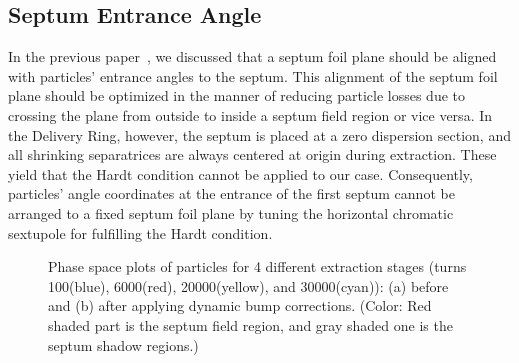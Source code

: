 \documentclass[aps,prstab,onecolumn,preprint]{revtex4-1}
\begin{document}
\subsection{\label{sec:bump0}Septum Entrance Angle}

In the previous paper~\cite{mu2e}, we discussed that a septum foil plane should be aligned with particles' entrance angles to the septum. This alignment of the septum foil plane should be optimized in the manner of reducing particle losses due to crossing the plane from outside to inside a septum field region or vice versa. In the Delivery Ring, however, the septum is placed at a zero dispersion section, and all shrinking separatrices are always centered at origin during extraction. These yield that the Hardt condition cannot be applied to our case. Consequently, particles' angle coordinates at the entrance of the first septum cannot be arranged to a fixed septum foil plane by tuning the horizontal chromatic sextupole for fulfilling the Hardt condition.

\begin{figure}[!hbtp]
  \caption{\label{fig:bump1}Phase space plots of particles for 4 different extraction stages (turns 100(blue), 6000(red), 20000(yellow), and 30000(cyan)): (a) before and (b) after applying dynamic bump corrections. (Color: Red shaded part is the septum field region, and gray shaded one is the septum shadow regions.)}
\end{figure}
\end{document}
